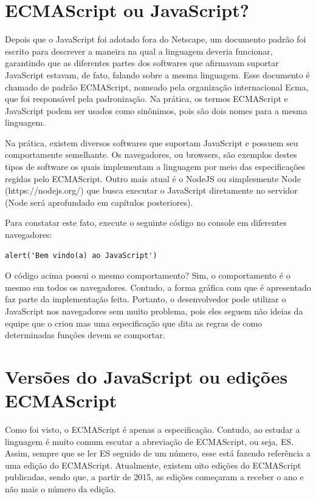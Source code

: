 \section{ECMAScript ou JavaScript?}

Depois que o JavaScript foi adotado fora do Netscape, um documento padrão foi 
escrito para descrever a maneira na qual a linguagem deveria funcionar, 
garantindo que as diferentes partes dos softwares que afirmavam suportar 
JavaScript estavam, de fato, falando sobre a mesma linguagem. Esse documento é 
chamado de padrão ECMAScript, nomeado pela organização internacional Ecma, que 
foi responsável pela padronização. Na prática, os termos ECMAScript e 
JavaScript podem ser usados como sinônimos, pois são dois nomes para a mesma 
linguagem.

Na prática, existem diversos softwares que suportam JavaScript e possuem seu 
comportamente semelhante. Os navegadores, ou browsers, são exemplos destes 
tipos de software os quais implementam a linguagem por meio das especificações 
regidas pelo ECMAScript. Outro mais atual é o NodeJS ou simplesmente Node 
(https://nodejs.org/) que busca executar o JavaScript diretamente no servidor 
(Node será aprofundado em capítulos posteriores).

Para constatar este fato, execute o seguinte código no console em diferentes 
navegadores: 

\begin{lstlisting}
alert('Bem vindo(a) ao JavaScript')
\end{lstlisting}

O código acima possui o mesmo comportamento? Sim, o comportamento é o mesmo em 
todos os navegadores. Contudo, a forma gráfica com que é apresentado faz parte 
da implementação feita. Portanto, o desenvolvedor pode utilizar o JavaScript 
nos navegadores sem muito problema, pois eles seguem não ideias da equipe que o 
criou mas uma especificação que dita as regras de como determinadas funções 
devem se comportar.

\section{Versões do JavaScript ou edições ECMAScript}

Como foi visto, o ECMAScript é apenas a especificação. Contudo, ao estudar a 
linguagem é muito comum escutar a abreviação de ECMAScript, ou seja, ES. Assim, 
sempre que se ler ES seguido de um número, esse está fazendo referência a uma 
edição do ECMAScript. Atualmente, existem oito edições do ECMAScript publicadas,
sendo que, a partir de 2015, as edições começaram a receber o ano e não mais o 
número da edição.

